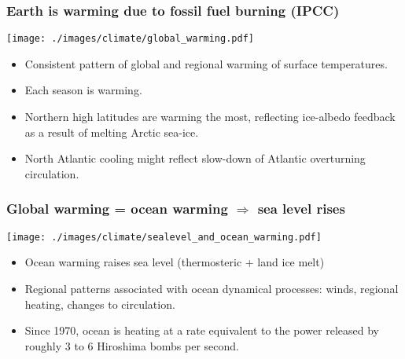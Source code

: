 \documentclass[10pt]{beamer}
\begin{document}
\begin{frame}
  \frametitle{Earth is warming due to fossil fuel burning (IPCC)}

\begin{center}
\vspace{-.25cm}
{\texttt{[image: ./images/climate/global\_warming.pdf]}}
\vspace{-.75cm}
\end{center}

\begin{exampleblock}{}
\begin{itemize}
\item Consistent pattern of global and regional warming of surface temperatures. 
\item Each season is warming.
\item Northern high latitudes are warming the most, reflecting
  ice-albedo feedback as a result of melting Arctic sea-ice.
\item North Atlantic cooling might reflect slow-down of Atlantic
  overturning circulation.
\end{itemize}
\end{exampleblock}{}

\end{frame}


\begin{frame}
  \frametitle{Global warming = ocean warming $\Rightarrow$ sea level rises}

\begin{center}
\vspace{-.25cm}
{\texttt{[image: ./images/climate/sealevel\_and\_ocean\_warming.pdf]}}
\vspace{-0.5cm}
\end{center}

\begin{exampleblock}{}
\begin{itemize}
\item Ocean warming raises sea level (thermosteric + land ice melt)
\item Regional patterns associated with ocean dynamical processes:
  winds, regional heating, changes to circulation.
\item Since 1970, ocean is heating at a rate equivalent to the power
  released by roughly 3 to 6 Hiroshima bombs per second.
\end{itemize}
\end{exampleblock}{}

\end{frame}
\end{document}
